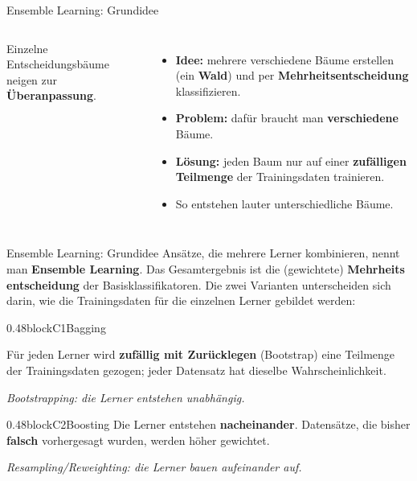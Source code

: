 
\begin{frame}{Ensemble Learning: Grundidee}
\begin{columns}
Einzelne Entscheidungsbäume neigen zur \textbf{Überanpassung}.

\vspace{0.4em}
\begin{itemize}
  \item \textbf{Idee:} mehrere verschiedene Bäume erstellen (ein
        \textbf{Wald}) und per \textbf{Mehrheitsentscheidung} klassifizieren.
  \item \textbf{Problem:} dafür braucht man \textbf{verschiedene} Bäume.
  \item \textbf{Lösung:} jeden Baum nur auf einer \textbf{zufälligen
        Teilmenge} der Trainingsdaten trainieren.
  \item[$\Rightarrow$] So entstehen lauter unterschiedliche Bäume.
\end{itemize}

\centering
{}\hfill
{}
\end{columns}
\end{frame}

\begin{frame}{Ensemble Learning: Grundidee}
Ansätze, die mehrere Lerner kombinieren, nennt man \textbf{Ensemble
Learning}. Das Gesamtergebnis ist die (gewichtete) \textbf{Mehrheits\-%
entscheidung} der Basisklassifikatoren. Die zwei Varianten unterscheiden
sich darin, wie die Trainingsdaten für die einzelnen Lerner gebildet werden:

\vspace{0.6em}
\begin{blockrow}
\begin{blockcol}{0.48\textwidth}{blockC1}{Bagging}

Für jeden Lerner wird \textbf{zufällig mit Zurücklegen} (Bootstrap) eine
Teilmenge der Trainingsdaten gezogen; jeder Datensatz hat dieselbe
Wahrscheinlichkeit.

\vspace{0.3em}
{\itshape Bootstrapping:  die Lerner entstehen unabhängig.}
\end{blockcol}

\begin{blockcol}{0.48\textwidth}{blockC2}{Boosting}
Die Lerner entstehen \textbf{nacheinander}. Datensätze, die bisher
\textbf{falsch} vorhergesagt wurden, werden höher gewichtet.

\vspace{0.3em}
{\itshape Resampling/Reweighting:  die Lerner bauen aufeinander auf.}
\end{blockcol}
\end{blockrow}
\end{frame}

